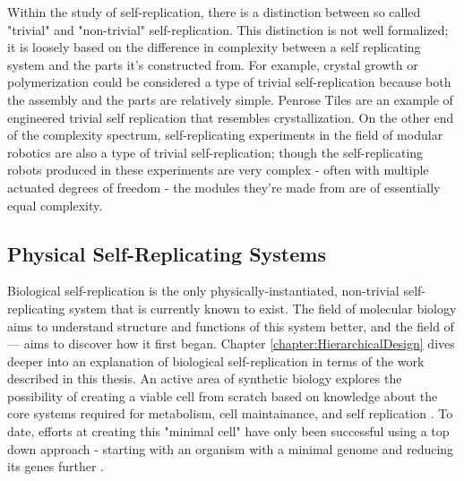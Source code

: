 {%
%
%


Within the study of self-replication, there is a distinction between so called "trivial" and "non-trivial" self-replication.  This distinction is not well formalized; it is loosely based on the difference in complexity between a self replicating system and the parts it's constructed from.  For example, crystal growth or polymerization could be considered a type of trivial self-replication because both the assembly and the parts are relatively simple.  Penrose Tiles \cite{Penrose1958} are an example of engineered trivial self replication that resembles crystallization.  On the other end of the complexity spectrum, self-replicating experiments in the field of modular robotics are also a type of trivial self-replication; though the self-replicating robots produced in these experiments are very complex  \cite{} - often with multiple actuated degrees of freedom - the modules they're made from are of essentially equal complexity.

\subsection{Physical Self-Replicating Systems}

Biological self-replication is the only physically-instantiated, non-trivial self-replicating system that is currently known to exist.  The field of molecular biology aims to understand structure and functions of this system better, and the field of --- aims to discover how it first began.  Chapter \ref{chapter:HierarchicalDesign} dives deeper into an explanation of biological self-replication in terms of the work described in this thesis.  An active area of synthetic biology explores the possibility of creating a viable cell from scratch based on knowledge about the core systems required for metabolism, cell maintainance, and self replication \cite{Forster2006}.  To date, efforts at creating this "minimal cell" have only been successful using a top down approach - starting with an organism with a minimal genome and reducing its genes further \cite{Glass2006} \cite{Gibson2010} \cite{james paper}.\\

}
